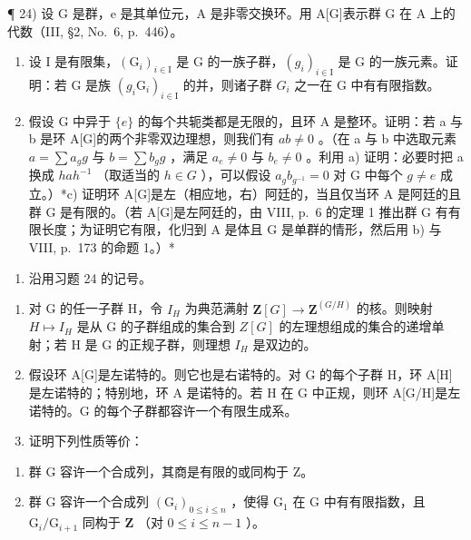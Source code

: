 ¶ 24) 设 G 是群，e 是其单位元，A 是非零交换环。用 A{[}G{]}表示群 G 在 A 上的代数（III, §2, No.~6, p.~446）。

\begin{enumerate}
\def\labelenumi{\alph{enumi})}
\item
  设 I 是有限集，\((\mathrm{G}_{i})_{i\in\mathrm{I}}\) 是 G 的一族子群，\((g_{i})_{i\in\mathrm{I}}\) 是 G 的一族元素。证明：若 G 是族 \((g_{i}\mathrm{G}_{i})_{i\in\mathrm{I}}\) 的并，则诸子群 \(G_{i}\) 之一在 G 中有有限指数。
\item
  假设 G 中异于 \(\{e\}\) 的每个共轭类都是无限的，且环 A 是整环。证明：若 a 与 b 是环 A{[}G{]}的两个非零双边理想，则我们有 \(ab \neq 0\) 。（在 a 与 b 中选取元素 \(a = \sum a_g g\) 与 \(b = \sum b_g g\) ，满足 \(a_e \neq 0\) 与 \(b_e \neq 0\) 。利用 a) 证明：必要时把 a 换成 \(hah^{-1}\) （取适当的 \(h \in G\) ），可以假设 \(a_g b_{g^{-1}} = 0\) 对 G 中每个 \(g \neq e\) 成立。）*c) 证明环 A{[}G{]}是左（相应地，右）阿廷的，当且仅当环 A 是阿廷的且群 G 是有限的。（若 A{[}G{]}是左阿廷的，由 VIII, p.~6 的定理 1 推出群 G 有有限长度；为证明它有限，化归到 A 是体且 G 是单群的情形，然后用 b) 与 VIII, p.~173 的命题 1。）*
\end{enumerate}

\begin{enumerate}
\def\labelenumi{\arabic{enumi})}
\setcounter{enumi}{24}
\tightlist
\item
  沿用习题 24 的记号。
\end{enumerate}

\begin{enumerate}
\def\labelenumi{\alph{enumi})}
\item
  对 G 的任一子群 H，令 \(I_{H}\) 为典范满射 \(\mathbf{Z}[G] \to \mathbf{Z}^{(G/H)}\) 的核。则映射 \(H \mapsto I_{H}\) 是从 G 的子群组成的集合到 \(Z[G]\) 的左理想组成的集合的递增单射；若 H 是 G 的正规子群，则理想 \(I_{H}\) 是双边的。
\item
  假设环 A{[}G{]}是左诺特的。则它也是右诺特的。对 G 的每个子群 H，环 A{[}H{]}是左诺特的；特别地，环 A 是诺特的。若 H 在 G 中正规，则环 A{[}G/H{]}是左诺特的。G 的每个子群都容许一个有限生成系。
\item
  证明下列性质等价：
\end{enumerate}

\begin{enumerate}
\def\labelenumi{(\roman{enumi})}
\item
  群 G 容许一个合成列，其商是有限的或同构于 Z。
\item
  群 G 容许一个合成列 \((\mathrm{G}_i)_{0\leqslant i\leqslant n}\) ，使得 \(\mathrm{G}_1\) 在 G 中有有限指数，且 \(\mathrm{G}_i / \mathrm{G}_{i + 1}\) 同构于 \(\mathbf{Z}\) （对 \(0\leqslant i\leqslant n - 1\) ）。
\end{enumerate}

